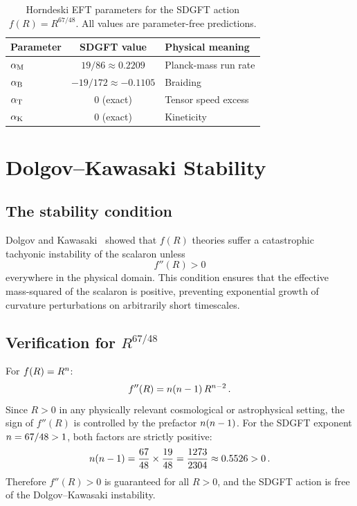 \documentclass[amsmath,amssymb,aps,prd,twocolumn,superscriptaddress,nofootinbib]{revtex4-2}
\begin{document}
\begin{table}[t]
\centering
\caption{Horndeski EFT parameters for the SDGFT action
$f(R) = R^{67/48}$.  All values are parameter-free predictions.}
\label{tab:horndeski}
\begin{tabular}{@{}lcl@{}}
\toprule
Parameter & SDGFT value & Physical meaning \\
\midrule
$\alpha_{\mathrm{M}}$ & $19/86 \approx 0.2209$ & Planck-mass run rate \\
$\alpha_{\mathrm{B}}$ & $-19/172 \approx -0.1105$ & Braiding \\
$\alpha_{\mathrm{T}}$ & $0$ (exact) & Tensor speed excess \\
$\alpha_{\mathrm{K}}$ & $0$ (exact) & Kineticity \\
\bottomrule
\end{tabular}
\end{table}

\section{Dolgov--Kawasaki Stability}
\label{sec:DK}

\subsection{The stability condition}

Dolgov and Kawasaki~\cite{Dolgov2003} showed that $f(R)$ theories
suffer a catastrophic tachyonic instability of the scalaron unless
\begin{equation}
  \boxed{f''(R) > 0}
  \label{eq:DK_condition}
\end{equation}
everywhere in the physical domain.  This condition ensures that the
effective mass-squared of the scalaron is positive, preventing
exponential growth of curvature perturbations on arbitrarily short
timescales.

\subsection{Verification for $R^{67/48}$}

For $f(R) = R^{n}$:
\begin{equation}
  f''(R) = n(n - 1)\,R^{n - 2}\,.
  \label{eq:fpp}
\end{equation}
Since $R > 0$ in any physically relevant cosmological or
astrophysical setting, the sign of $f''(R)$ is controlled by the
prefactor $n(n - 1)$.  For the SDGFT exponent
$n = 67/48 > 1$, both factors are strictly positive:
\begin{equation}
  n(n - 1) = \frac{67}{48} \times \frac{19}{48}
                 = \frac{1273}{2304}
                 \approx 0.5526 > 0\,.
  \label{eq:DK_check}
\end{equation}
Therefore $f''(R) > 0$ is guaranteed for all $R > 0$, and the
SDGFT action is free of the Dolgov--Kawasaki instability.
\end{document}
